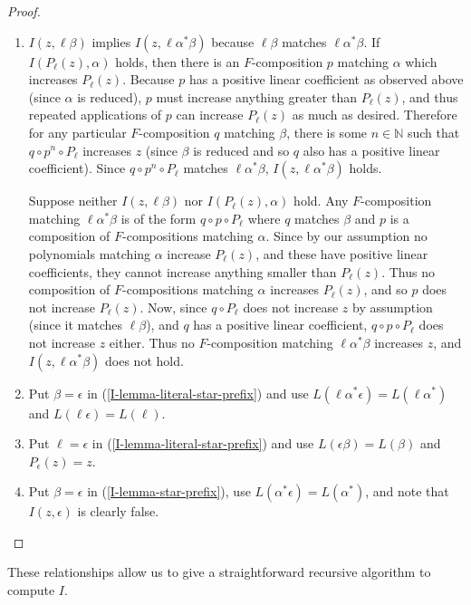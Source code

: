\documentclass[11pt]{amsart}
\newcommand{\N}{\mathbb{N}}
\theoremstyle{definition}
\theoremstyle{remark}
\begin{document}
\begin{proof}
\begin{enumerate}
\item $I(z, \ell \beta)$ implies $I(z, \ell \alpha^* \beta)$ because $\ell \beta$ matches $\ell \alpha^* \beta$. If $I(P_\ell(z), \alpha)$ holds, then there is an $F$-composition $p$ matching $\alpha$ which increases $P_\ell(z)$. Because $p$ has a positive linear coefficient as observed above (since $\alpha$ is reduced), $p$ must increase anything greater than $P_\ell(z)$, and thus repeated applications of $p$ can increase $P_\ell(z)$ as much as desired. Therefore for any particular $F$-composition $q$ matching $\beta$, there is some $n \in \N$ such that $q \circ p^n \circ P_\ell$ increases $z$ (since $\beta$ is reduced and so $q$ also has a positive linear coefficient). Since $q \circ p^n \circ P_\ell$ matches $\ell \alpha^* \beta$, $I(z, \ell \alpha^* \beta)$ holds.

Suppose neither $I(z, \ell \beta)$ nor $I(P_\ell(z), \alpha)$ hold. Any $F$-composition matching $\ell \alpha^* \beta$ is of the form $q \circ p \circ P_\ell$ where $q$ matches $\beta$ and $p$ is a composition of $F$-compositions matching $\alpha$. Since by our assumption no polynomials matching $\alpha$ increase $P_\ell(z)$, and these have positive linear coefficients, they cannot increase anything smaller than $P_\ell(z)$. Thus no composition of $F$-compositions matching $\alpha$ increases $P_\ell(z)$, and so $p$ does not increase $P_\ell(z)$. Now, since $q \circ P_\ell$ does not increase $z$ by assumption (since it matches $\ell \beta$), and $q$ has a positive linear coefficient, $q \circ p \circ P_\ell$ does not increase $z$ either. Thus no $F$-composition matching $\ell \alpha^* \beta$ increases $z$, and $I(z, \ell \alpha^* \beta)$ does not hold.
\item Put $\beta = \epsilon$ in (\ref{I-lemma-literal-star-prefix}) and use $L(\ell \alpha^* \epsilon) = L(\ell \alpha^*)$ and $L(\ell \epsilon) = L(\ell)$.
\item Put $\ell = \epsilon$ in (\ref{I-lemma-literal-star-prefix}) and use $L(\epsilon \beta) = L(\beta)$ and $P_\epsilon(z) = z$.
\item Put $\beta = \epsilon$ in (\ref{I-lemma-star-prefix}), use $L(\alpha^* \epsilon) = L(\alpha^*)$, and note that $I(z, \epsilon)$ is clearly false. \qedhere
\end{enumerate}
\end{proof}

These relationships allow us to give a straightforward recursive algorithm to compute $I$.
\end{document}
